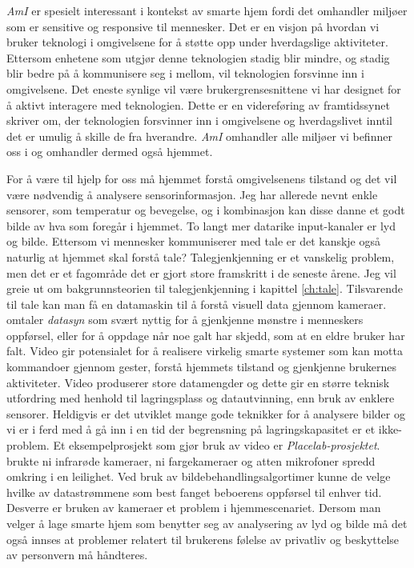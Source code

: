 \emph{AmI} er spesielt interessant i kontekst av smarte hjem fordi det omhandler miljøer som er sensitive og responsive til mennesker. Det er en visjon på hvordan vi bruker teknologi i omgivelsene for å støtte opp under hverdagslige aktiviteter. Ettersom enhetene som utgjør denne teknologien stadig blir mindre, og stadig blir bedre på å kommunisere seg i mellom, vil teknologien forsvinne inn i omgivelsene. Det eneste synlige vil være brukergrensesnittene vi har designet for å aktivt interagere med teknologien. Dette er en videreføring av framtidssynet \citet{weiser91} skriver om, der teknologien forsvinner inn i omgivelsene og hverdagslivet inntil det er umulig å skille de fra hverandre. \emph{AmI} omhandler alle miljøer vi befinner oss i og omhandler dermed også hjemmet.

For å være til hjelp for oss må hjemmet forstå omgivelsenens tilstand og det vil være nødvendig å analysere sensorinformasjon. Jeg har allerede nevnt enkle sensorer, som temperatur og bevegelse, og i kombinasjon kan disse danne et godt bilde av hva som foregår i hjemmet. To langt mer datarike input-kanaler er lyd og bilde. Ettersom vi mennesker kommuniserer med tale er det kanskje også naturlig at hjemmet skal forstå tale? Talegjenkjenning er et vanskelig problem, men det er et fagområde det er gjort store framskritt i de seneste årene. Jeg vil greie ut om bakgrunnsteorien til talegjenkjenning i kapittel \ref{ch:tale}. Tilsvarende til tale kan man få en datamaskin til å forstå visuell data gjennom kameraer. \citet{augustonugent06} omtaler \emph{datasyn} som svært nyttig for å gjenkjenne mønstre i menneskers oppførsel, eller for å oppdage når noe galt har skjedd, som at en eldre bruker har falt. Video gir potensialet for å realisere virkelig smarte systemer som kan motta kommandoer gjennom gester, forstå hjemmets tilstand og gjenkjenne brukernes aktiviteter. Video produserer store datamengder og dette gir en større teknisk utfordring med henhold til lagringsplass og datautvinning, enn bruk av enklere sensorer. Heldigvis er det utviklet mange gode teknikker for å analysere bilder og vi er i ferd med å gå inn i en tid der begrensning på lagringskapasitet er et ikke-problem. Et eksempelprosjekt som gjør bruk av video er \emph{Placelab-prosjektet}. \citet{placelab05} brukte ni infrarøde kameraer, ni fargekameraer og atten mikrofoner spredd omkring i en leilighet. Ved bruk av bildebehandlingsalgortimer kunne de velge hvilke av datastrømmene som best fanget beboerens oppførsel til enhver tid. Desverre er bruken av kameraer et problem i hjemmescenariet. Dersom man velger å lage smarte hjem som benytter seg av analysering av lyd og bilde må det også innses at problemer relatert til brukerens følelse av privatliv og beskyttelse av personvern må håndteres.

